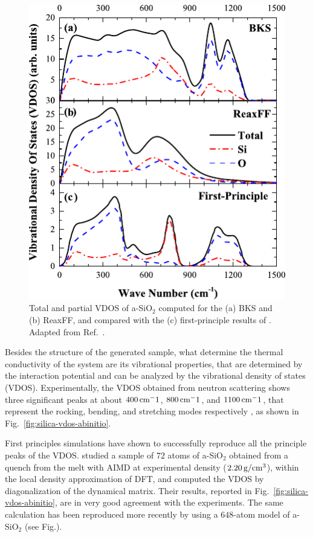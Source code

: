 \begin{figure}
    \centering
    \includegraphics{chapters/chapter6/figures/Tian_VDOS_silica.pdf}
    \caption{
    Total and partial VDOS of a-SiO$_2$ computed for the (a) BKS and (b) ReaxFF, and compared with the (c) first-principle results of \citet{Bhattarai2016}. Adapted from Ref.~\cite{Tian2017}.}
    \label{fig:silica-vdos-classical}
\end{figure}

Besides the structure of the generated sample, what determine the thermal conductivity of the system are its vibrational properties, that are determined by the interaction potential and can be analyzed by the vibrational density of states (VDOS).
Experimentally, the VDOS obtained from neutron scattering shows three significant peaks at about $400\,\mathrm{cm^-1}$, $800\,\mathrm{cm^-1}$, and $1100\,\mathrm{cm^-1}$, that represent the rocking, bending, and stretching modes respectively \cite{Galeener1983}, as shown in Fig.~\ref{fig:silica-vdos-abinitio}.

First principles simulations have shown to successfully reproduce all the principle peaks of the VDOS. \citet{Sarnthein1997} studied a sample of $72$ atoms of a-SiO$_2$ obtained from a quench from the melt with AIMD at experimental density ($2.20\,\mathrm{g/cm^3}$), within the local density approximation of DFT, and computed the VDOS by diagonalization of the dynamical matrix. Their results, reported in Fig.~\ref{fig:silica-vdos-abinitio}, are in very good agreement with the experiments. The same calculation has been reproduced more recently by \citet{Bhattarai2016} using a $648$-atom model of a-SiO$_2$ (see Fig.).


